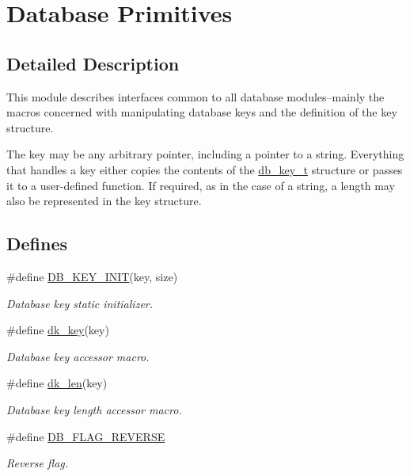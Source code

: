 \hypertarget{group__dbprim}{
\section{Database Primitives}
\label{group__dbprim}
}


\subsection{Detailed Description}
This module describes interfaces common to all database modules--mainly the macros concerned with manipulating database keys and the definition of the key structure.

The key may be any arbitrary pointer, including a pointer to a string. Everything that handles a key either copies the contents of the \hyperlink{group__dbprim_a0}{db\_\-key\_\-t} structure or passes it to a user-defined function. If required, as in the case of a string, a length may also be represented in the key structure. \subsection*{Defines}
\begin{CompactItemize}
\item 
\#define \hyperlink{group__dbprim_a1}{DB\_\-KEY\_\-INIT}(key, size)
\begin{CompactList}\small\item\em Database key static initializer.\item\end{CompactList}\item 
\#define \hyperlink{group__dbprim_a2}{dk\_\-key}(key)
\begin{CompactList}\small\item\em Database key accessor macro.\item\end{CompactList}\item 
\#define \hyperlink{group__dbprim_a3}{dk\_\-len}(key)
\begin{CompactList}\small\item\em Database key length accessor macro.\item\end{CompactList}\item 
\#define \hyperlink{group__dbprim_a4}{DB\_\-FLAG\_\-REVERSE}
\begin{CompactList}\small\item\em Reverse flag.\item\end{CompactList}\end{CompactItemize}

